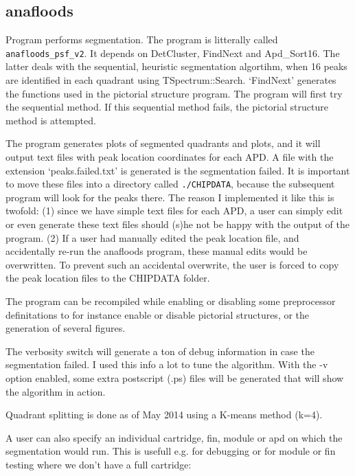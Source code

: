 \documentclass[12pt]{article}
\begin{document}
\subsection{anafloods}
Program performs segmentation. The program is litterally called {\tt anafloods\_psf\_v2}. It depends on DetCluster, FindNext and Apd\_Sort16. The latter deals with the sequential, heuristic segmentation algortihm, when 16 peaks are identified in each quadrant using TSpectrum::Search. `FindNext' generates the functions used in the pictorial structure program. The program will first try the sequential method. If this sequential method fails, the pictorial structure method is attempted.

The program generates plots of segmented quadrants and plots, and it will output text files with peak location coordinates for each APD. A file with the extension `peaks.failed.txt' is generated is the segmentation failed. It is important to move these files into a directory called {\tt ./CHIPDATA}, because the subsequent program will look for the peaks there. The reason I implemented it like this is twofold: (1) since we have simple text files for each APD, a user can simply edit or even generate these text files should (s)he not be happy with the output of the program. (2) If a user had manually edited the peak location file, and accidentally re-run the anafloods program, these manual edits would be overwritten. To prevent such an accidental overwrite, the user is forced to copy the peak location files to the CHIPDATA folder. 

The program can be recompiled while enabling or disabling some preprocessor definitations to for instance enable or disable pictorial structures, or the generation of several figures. 

The verbosity switch will generate a ton of debug information in case the segmentation failed. I used this info a lot to tune the algorithm. With the -v option enabled, some extra postscript (.ps) files will be generated that will show the algorithm in action. 

Quadrant splitting is done as of May 2014 using a K-means method (k=4).

A user can also specify an individual cartridge, fin, module or apd on which the segmentation would run. This is usefull e.g. for debugging or for module or fin testing where we don't have a full cartridge:\\
\end{document}
